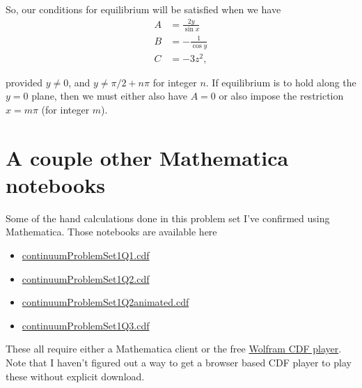 So, our conditions for equilibrium will be satisfied when we have
\begin{align}\label{eqn:continuumProblemSet1:550}
A &= \frac{2 y }{\sin x} \\
B &= -\frac{1}{\cos y} \\
C &= -3 z^2,
\end{align}

provided $y \ne 0$, and $y \ne \pi/2 + n\pi$ for integer $n$.  If equilibrium is to hold along the $y = 0$ plane, then we must either also have $A = 0$ or also impose the restriction $x = m \pi$ (for integer $m$).

\section{A couple other Mathematica notebooks}

Some of the hand calculations done in this problem set I've confirmed using Mathematica.  Those notebooks are available here

\begin{itemize}
\item 
\href{https://raw.github.com/peeterjoot/physicsplay/master/notes/phy454/mathematica/continuumProblemSet1Q1.cdf}{continuumProblemSet1Q1.cdf}
\item 
\href{https://raw.github.com/peeterjoot/physicsplay/master/notes/phy454/mathematica/continuumProblemSet1Q2.cdf}{continuumProblemSet1Q2.cdf}
\item 
\href{https://raw.github.com/peeterjoot/physicsplay/master/notes/phy454/mathematica/continuumProblemSet1Q2animated.cdf}{continuumProblemSet1Q2animated.cdf}
\item 
\href{https://raw.github.com/peeterjoot/physicsplay/master/notes/phy454/mathematica/continuumProblemSet1Q3.cdf}{continuumProblemSet1Q3.cdf}
\end{itemize}

These all require either a Mathematica client or the free \href{http://www.wolfram.com/cdf-player/}{Wolfram CDF player}.  Note that I haven't figured out a way to get a browser based CDF player to play these without explicit download.
